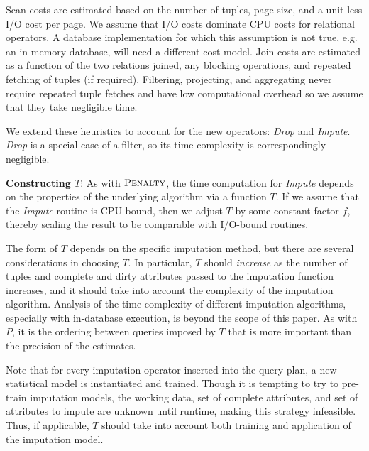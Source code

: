 {Scan costs are estimated based on the number of tuples, page size, and a unit-less I/O cost per page. 
We assume that I/O costs dominate CPU costs for relational operators. 
A database implementation for which this assumption is not true, e.g. an in-memory database, will need a different cost model.
Join costs are estimated as a function of the two relations joined, any blocking operations, and repeated fetching of tuples (if required).
Filtering, projecting, and aggregating never require repeated tuple fetches and have low computational overhead so we assume that they take negligible time.

We extend these heuristics to account for the new operators: \textit{Drop} and \textit{Impute}.
\textit{Drop} is a special case of a filter, so its time complexity is correspondingly negligible. 

\textbf{Constructing $T$}:
As with $\textsc{Penalty}$, the time computation for \textit{Impute} depends on the properties of the underlying algorithm via a function $T$.
If we assume that the \textit{Impute} routine is CPU-bound, then we adjust $T$ by some constant factor $f$, thereby scaling the result to be comparable with I/O-bound routines.

The form of $T$ depends on the specific imputation method, but there are several considerations in choosing $T$.
In particular, $T$ should \emph{increase} as the number of tuples and complete and dirty attributes passed to the imputation function increases, and it should take into account the complexity of the imputation algorithm.
Analysis of the time complexity of different imputation algorithms, especially with in-database execution, is beyond the scope of this paper.
As with $P$, it is the ordering between queries imposed by $T$ that is more important than the precision of the estimates.

Note that for every imputation operator inserted into the query plan, a new
statistical model is instantiated and trained.
Though it is tempting to try to pre-train imputation models, the working data, set of complete attributes, and set of attributes to impute are unknown until runtime, making this strategy infeasible.
Thus, if applicable, $T$ should take into account both
training and application of the imputation model.


}
